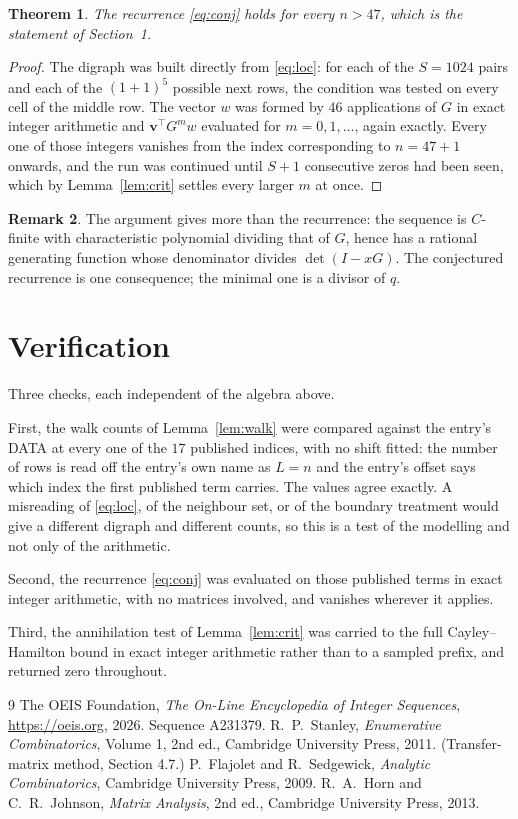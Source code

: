 \documentclass[11pt,a4paper]{article}
\theoremstyle{plain}
\newtheorem{theorem}{Theorem}
\theoremstyle{definition}
\newtheorem{remark}[theorem]{Remark}
\begin{document}
\begin{theorem}
The recurrence \eqref{eq:conj} holds for every $n>47$, which is the statement of
Section~1.
\end{theorem}

\begin{proof}
The digraph was built directly from \eqref{eq:loc}: for each of the $S=1024$ pairs and each
of the $(1+1)^{5}$ possible next rows, the condition was tested on every cell of
the middle row. The vector $w$ was formed by $46$ applications of $G$ in exact integer
arithmetic and $\mathbf{v}^{\!\top}G^{m}w$ evaluated for $m=0,1,\dots$, again exactly.
Every one of those integers vanishes from the index corresponding to $n=47+1$ onwards,
and the run was continued until $S+1$ consecutive zeros had been seen, which by
Lemma~\ref{lem:crit} settles every larger $m$ at once.
\end{proof}

\begin{remark}
The argument gives more than the recurrence: the sequence is $C$-finite with characteristic
polynomial dividing that of $G$, hence has a rational generating function whose denominator
divides $\det(I-xG)$. The conjectured recurrence is one consequence; the minimal one is a
divisor of $q$.
\end{remark}

\section{Verification}

Three checks, each independent of the algebra above.

First, the walk counts of Lemma~\ref{lem:walk} were compared against the entry's DATA at
every one of the $17$ published indices, with no shift fitted: the number of rows is
read off the entry's own name as $L=n$ and the entry's offset says which index the first
published term carries. The values agree exactly. A misreading of \eqref{eq:loc}, of the
neighbour set, or of the boundary treatment would give a different digraph and different
counts, so this is a test of the modelling and not only of the arithmetic.

Second, the recurrence \eqref{eq:conj} was evaluated on those published terms in exact
integer arithmetic, with no matrices involved, and vanishes wherever it applies.

Third, the annihilation test of Lemma~\ref{lem:crit} was carried to the full
Cayley--Hamilton bound in exact integer arithmetic rather than to a sampled prefix, and
returned zero throughout.

\begin{thebibliography}{9}
 The OEIS Foundation, \emph{The On-Line Encyclopedia of Integer
Sequences}, \url{https://oeis.org}, 2026. Sequence A231379.
 R.~P.~Stanley, \emph{Enumerative Combinatorics}, Volume 1, 2nd ed.,
Cambridge University Press, 2011. (Transfer-matrix method, Section 4.7.)
 P.~Flajolet and R.~Sedgewick, \emph{Analytic Combinatorics}, Cambridge
University Press, 2009.
 R.~A.~Horn and C.~R.~Johnson, \emph{Matrix Analysis}, 2nd ed., Cambridge
University Press, 2013.
\end{thebibliography}
\end{document}
